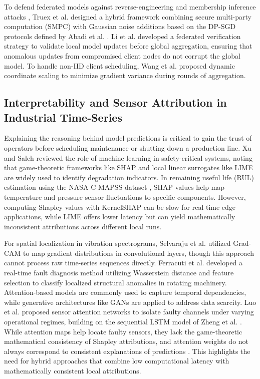 \documentclass[journal,10pt,compsoc]{IEEEtran}
\begin{document}
To defend federated models against reverse-engineering and membership inference attacks \cite{shokri_mia, fredrikson_model_inversion}, Truex et al. \cite{truex_dp} designed a hybrid framework combining secure multi-party computation (SMPC) with Gaussian noise additions based on the DP-SGD protocols defined by Abadi et al. \cite{abadi_dp_sgd}. Li et al. \cite{he_fed_iot} developed a federated verification strategy to validate local model updates before global aggregation, ensuring that anomalous updates from compromised client nodes do not corrupt the global model. To handle non-IID client scheduling, Wang et al. \cite{wang_non_iid} proposed dynamic coordinate scaling to minimize gradient variance during rounds of aggregation.

\subsection{Interpretability and Sensor Attribution in Industrial Time-Series}
Explaining the reasoning behind model predictions is critical to gain the trust of operators before scheduling maintenance or shutting down a production line. Xu and Saleh \cite{xu_ml_reliability} reviewed the role of machine learning in safety-critical systems, noting that game-theoretic frameworks like SHAP \cite{shap} and local linear surrogates like LIME \cite{ribeiro_lime} are widely used to identify degradation indicators. In remaining useful life (RUL) estimation using the NASA C-MAPSS dataset \cite{cmapss}, SHAP values help map temperature and pressure sensor fluctuations to specific components. However, computing Shapley values with KernelSHAP can be slow for real-time edge applications, while LIME offers lower latency but can yield mathematically inconsistent attributions across different local runs.

For spatial localization in vibration spectrograms, Selvaraju et al. \cite{selvaraju_gradcam} utilized Grad-CAM to map gradient distributions in convolutional layers, though this approach cannot process raw time-series sequences directly. Ferracuti et al. \cite{ferracuti_tase} developed a real-time fault diagnosis method utilizing Wasserstein distance and feature selection to classify localized structural anomalies in rotating machinery. Attention-based models \cite{vaswani_attention} are commonly used to capture temporal dependencies, while generative architectures like GANs \cite{goodfellow_gan} are applied to address data scarcity. Luo et al. \cite{luo_sensor_att} proposed sensor attention networks to isolate faulty channels under varying operational regimes, building on the sequential LSTM model of Zheng et al. \cite{zheng_lstm}. While attention maps help locate faulty sensors, they lack the game-theoretic mathematical consistency of Shapley attributions, and attention weights do not always correspond to consistent explanations of predictions \cite{jain_attention}. This highlights the need for hybrid approaches that combine low computational latency with mathematically consistent local attributions.
\end{document}
